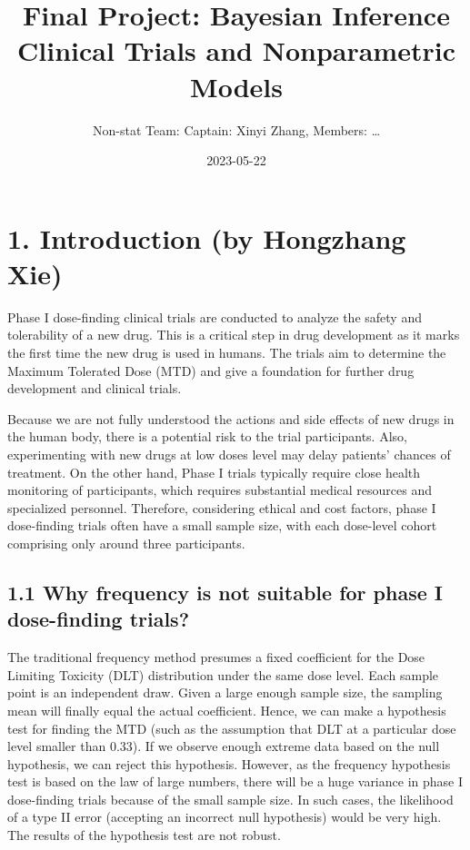 \documentclass[
]{article}
\title{Final Project: Bayesian Inference Clinical Trials and
Nonparametric Models}
\author{Non-stat Team: Captain: Xinyi Zhang, Members: \ldots{}}
\date{2023-05-22}
\begin{document}
\maketitle

\hypertarget{introduction-by-hongzhang-xie}{%
\section{1. Introduction (by Hongzhang
Xie)}\label{introduction-by-hongzhang-xie}}

Phase I dose-finding clinical trials are conducted to analyze the safety
and tolerability of a new drug. This is a critical step in drug
development as it marks the first time the new drug is used in humans.
The trials aim to determine the Maximum Tolerated Dose (MTD) and give a
foundation for further drug development and clinical trials.

Because we are not fully understood the actions and side effects of new
drugs in the human body, there is a potential risk to the trial
participants. Also, experimenting with new drugs at low doses level may
delay patients' chances of treatment. On the other hand, Phase I trials
typically require close health monitoring of participants, which
requires substantial medical resources and specialized personnel.
Therefore, considering ethical and cost factors, phase I dose-finding
trials often have a small sample size, with each dose-level cohort
comprising only around three participants.

\hypertarget{why-frequency-is-not-suitable-for-phase-i-dose-finding-trials}{%
\subsection{1.1 Why frequency is not suitable for phase I dose-finding
trials?}\label{why-frequency-is-not-suitable-for-phase-i-dose-finding-trials}}

The traditional frequency method presumes a fixed coefficient for the
Dose Limiting Toxicity (DLT) distribution under the same dose level.
Each sample point is an independent draw. Given a large enough sample
size, the sampling mean will finally equal the actual coefficient.
Hence, we can make a hypothesis test for finding the MTD (such as the
assumption that DLT at a particular dose level smaller than 0.33). If we
observe enough extreme data based on the null hypothesis, we can reject
this hypothesis. However, as the frequency hypothesis test is based on
the law of large numbers, there will be a huge variance in phase I
dose-finding trials because of the small sample size. In such cases, the
likelihood of a type II error (accepting an incorrect null hypothesis)
would be very high. The results of the hypothesis test are not robust.
\end{document}

